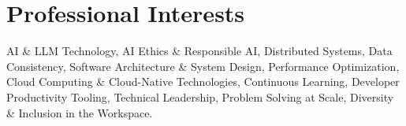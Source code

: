 
\section{Professional Interests}
\footnotesize{AI \& LLM Technology, AI Ethics \& Responsible AI, Distributed Systems, Data Consistency,
    Software Architecture \& System Design, Performance Optimization, Cloud Computing \& Cloud-Native 
    Technologies, Continuous Learning, Developer Productivity Tooling, Technical Leadership, Problem 
    Solving at Scale, Diversity \& Inclusion in the Workspace.}